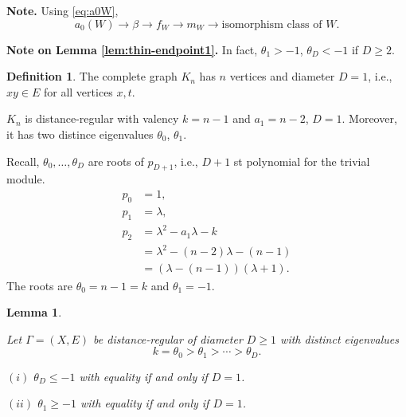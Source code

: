 \documentclass[
]{book}
\newtheorem{lemma}{Lemma}[chapter]
\theoremstyle{definition}
\newtheorem{definition}{Definition}[chapter]
\theoremstyle{definition}
\theoremstyle{definition}
\theoremstyle{definition}
\theoremstyle{remark}
\begin{document}
\textbf{Note.}
Using \eqref{eq:a0W},
\[a_0(W) \to \beta \to f_W \to m_W \to \text{isomorphism class of $W$}.\]

\textbf{Note on Lemma \ref{lem:thin-endpoint1}.}
In fact, \(\theta_1 > -1\), \(\theta_D < -1\) if \(D\geq 2\).

\begin{definition}
\protect\hypertarget{def:complete-graph}{}\label{def:complete-graph}The complete graph  \(K_n\) has \(n\) vertices and diameter \(D = 1\), i.e., \(xy\in E\) for all vertices \(x,t\).
\end{definition}

\(K_n\) is distance-regular with valency \(k = n-1\) and \(a_1 = n-2\), \(D = 1\).
Moreover, it has two distince eigenvalues \(\theta_0\), \(\theta_1\).

Recall, \(\theta_0, \ldots, \theta_D\) are roots of \(p_{D+1}\), i.e., \(D+1\) st polynomial for the trivial module.
\begin{align}
p_0 & = 1,\\
p_1 & = \lambda,\\
p_2 & = \lambda^2 - a_1\lambda - k\\
& = \lambda^2 - (n-2)\lambda - (n-1)\\
& = (\lambda - (n-1))(\lambda +1).
\end{align}
The roots are \(\theta_0 = n-1 = k\) and \(\theta_1 = -1\).

\begin{lemma}
\protect\hypertarget{lem:sedond-and-largest-ev}{}\label{lem:sedond-and-largest-ev}

Let \(\Gamma = (X, E)\) be distance-regular of diameter \(D\geq 1\) with distinct eigenvalues
\[k = \theta_0 > \theta_1 > \cdots > \theta_D.\]

\((i)\) \(\theta_D\leq -1\) with equality if and only if \(D = 1\).

\((ii)\) \(\theta_1 \geq -1\) with equality if and only if \(D=1\).

\end{lemma}
\end{document}
